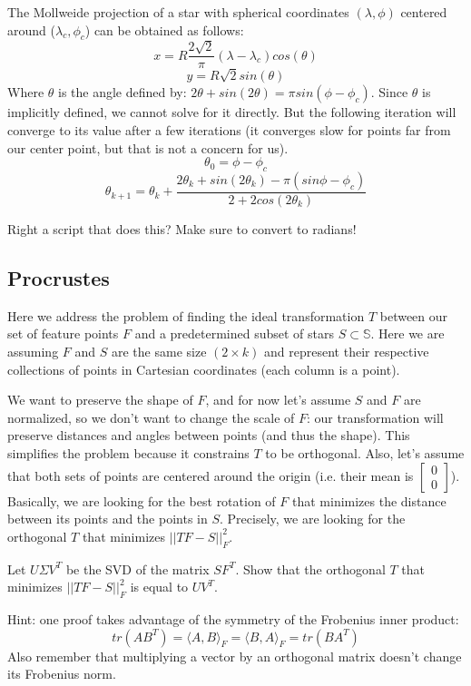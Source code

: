 \documentclass[paper=a4, fontsize=11pt]{scrartcl} %
\begin{document}
The Mollweide projection of a star with spherical coordinates $(\lambda,\phi)$ centered around ($\lambda_c,\phi_c$) can be obtained as follows:
$$
x = R\frac{2\sqrt{2}}{\pi}(\lambda-\lambda_c)cos(\theta)$$$$
y = R\sqrt{2}sin(\theta)
$$
Where $\theta$ is the angle defined by: $2\theta + sin(2\theta)=\pi sin(\phi-\phi_c)$.  Since $\theta$ is implicitly defined, we cannot solve for it directly. But the following iteration will converge to its value after a few iterations (it converges slow for points far from our center point, but that is not a concern for us).
$$
\theta_0 = \phi-\phi_c
$$$$
\theta_{k+1} = \theta_k + \frac{2\theta_k+sin(2\theta_k)-\pi(sin\phi-\phi_c)}{2+2cos(2\theta_k)}
$$

Right a script that does this?  Make sure to convert to radians!


\subsection{Procrustes}
Here we address the problem of finding the ideal transformation $T$ between our set of feature points $F$ and a predetermined subset of stars $S\subset \mathbb{S}$. Here we are assuming $F$ and $S$ are the same size $(2\times k)$ and represent their respective collections of points in Cartesian coordinates (each column is a point).

We want to preserve the shape of $F$, and for now let's assume $S$ and $F$ are normalized, so we don't want to change the scale of $F$: our transformation will preserve distances and angles between points (and thus the shape). This simplifies the problem because it constrains $T$ to be orthogonal. Also, let's assume that both sets of points are centered around the origin (i.e. their mean is $\begin{bmatrix}
0\\
0
\end{bmatrix}$). Basically, we are looking for the best rotation of $F$ that minimizes the distance between its points and the points in $S$. Precisely, we are looking for the orthogonal $T$ that minimizes $||TF-S||^2_F$.

Let $U\Sigma V^T$ be the SVD of the matrix $SF^T$. Show that the orthogonal $T$ that minimizes $||TF-S||^2_F$ is equal to $UV^T$.

Hint: one proof takes advantage of the symmetry of the Frobenius inner product:
$$tr(AB^T) = \langle A,B\rangle_F = \langle B,A\rangle_F = tr(BA^T)$$
Also remember that multiplying a vector by an orthogonal matrix doesn't change its Frobenius norm.
\end{document}

